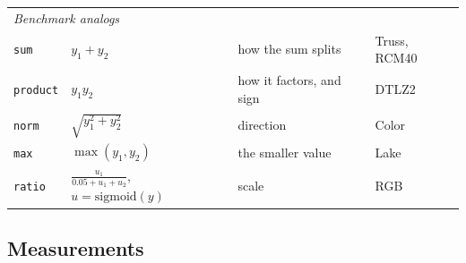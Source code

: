 \documentclass[11pt]{article}
\begin{document}
\begin{center}
\begin{tabular}{llp{3.6cm}p{3.3cm}}
\midrule
\multicolumn{4}{l}{\emph{Benchmark analogs}}\\
\texttt{sum}     & $y_1+y_2$ & how the sum splits & Truss, RCM40 \\
\texttt{product} & $y_1y_2$ & how it factors, and sign & DTLZ2 \\
\texttt{norm}    & $\sqrt{y_1^2+y_2^2}$ & direction & Color \\
\texttt{max}     & $\max(y_1,y_2)$ & the smaller value & Lake \\
\texttt{ratio}   & $\frac{u_1}{0.05+u_1+u_2}$, $u=\mathrm{sigmoid}(y)$ & scale & RGB \\
\bottomrule
\end{tabular}
\end{center}

\subsection{Measurements}
\end{document}
